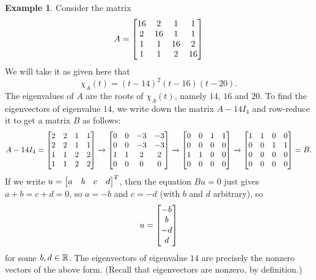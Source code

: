 \documentclass[reqno]{amsart}
\theoremstyle{definition}
\newtheorem{example}[theorem]{Example}
\begin{document}
\begin{example}\label{eg-eigen-iv}
 Consider the matrix
 \[ A  = \left[\begin{matrix}
          16 &  2 &  1 &  1 \\
           2 & 16 &  1 &  1 \\
           1 &  1 & 16 &  2 \\
           1 &  1 &  2 & 16
         \end{matrix}\right]
 \]
 We will take it as given here that
 \[ \chi_A(t) = (t-14)^2 (t-16) (t-20). \]
 The eigenvalues of $A$ are the roots of $\chi_A(t)$, namely $14$,
 $16$ and $20$.  To find the eigenvectors of eigenvalue $14$, we write
 down the matrix $A-14I_4$ and row-reduce it to get a matrix $B$ as follows:
 \[ A-14I_4 =
  \left[\begin{matrix}
    2 &  2 &  1 &  1 \\
    2 &  2 &  1 &  1 \\
    1 &  1 &  2 &  2 \\
    1 &  1 &  2 &  2
   \end{matrix}\right]
   \xrightarrow{}
  \left[\begin{matrix}
    0 &  0 & -3 & -3 \\
    0 &  0 & -3 & -3 \\
    1 &  1 &  2 &  2 \\
    0 &  0 &  0 &  0
   \end{matrix}\right]
   \xrightarrow{}
  \left[\begin{matrix}
    0 &  0 &  1 &  1 \\
    0 &  0 &  0 &  0 \\
    1 &  1 &  0 &  0 \\
    0 &  0 &  0 &  0
   \end{matrix}\right]
   \xrightarrow{}
  \left[\begin{matrix}
    1 &  1 &  0 &  0 \\
    0 &  0 &  1 &  1 \\
    0 &  0 &  0 &  0 \\
    0 &  0 &  0 &  0
   \end{matrix}\right] = B.
 \]
 If we write $u=\left[\begin{matrix} a & b & c & d\end{matrix}\right]^T$, then the equation $Bu=0$
 just gives $a+b=c+d=0$, so $a=-b$ and $c=-d$ (with $b$ and $d$
 arbitrary), so
 \[ u = \left[\begin{matrix} -b \\ b \\ -d \\ d \end{matrix}\right] \]
 for some $b,d\in{\mathbb{R}}$.  The eigenvectors of eigenvalue $14$ are
 precisely the nonzero vectors of the above form.  (Recall that
 eigenvectors are nonzero, by definition.)
\end{example}
\end{document}
